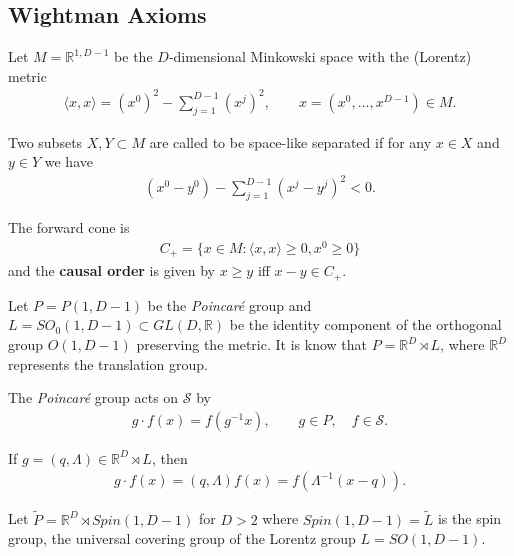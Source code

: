 \documentclass[a4paper,10pt]{amsart}
\newcommand{\SSS}{\mathcal S}
\newcommand{\PPP}{\widetilde{P}}
\newcommand{\LLL}{\widetilde{L}}
\newcommand{\R}{\mathbb R}  %
\begin{document}
\subsection{Wightman Axioms}

Let $M = \R^{1, D-1}$ be the $D$-dimensional Minkowski space with the 
(Lorentz) metric
\begin{align*}
    \langle x, x \rangle = (x^{0})^{2} - \sum_{j=1}^{D-1}(x^{j})^{2},
    \qquad x = (x^{0}, \ldots, x^{D-1}) \in M.
\end{align*}

Two subsets $X, Y \subset M$ are called to be space-like separated if for
any $x \in X$ and $y \in Y$ we have
\begin{align*}
    (x^{0} - y^{0}) - \sum^{D-1}_{j=1}(x^{j} - y^{j})^2 < 0. 
\end{align*}

The forward cone is 
\begin{align*}
    C_{+} = \{x \in M : \langle x, x \rangle \geq 0, x^{0} \geq 0\}
\end{align*}
and the \textbf{causal order} is given by $x \geq y$ iff $x-y \in C_{+}$.

Let $P = P(1, D-1)$ be the \textit{Poincar\'{e}} group and
$L = SO_{0}(1, D-1) \subset GL(D, \R)$ be the identity component of 
the orthogonal group $O(1, D-1)$ preserving the metric.
It is know that $P = \R^{D} \rtimes L$, where $\R^{D}$ represents 
the translation group.

The \textit{Poincar\'{e}} group acts on $\SSS$ by
\begin{align*}
    g \cdot  f(x) = f(g^{-1}x), \qquad g \in P, \quad f \in \SSS.
\end{align*}

If $g = (q, \Lambda) \in \R^{D} \rtimes L$, then
\begin{align*}
    g \cdot f (x) = (q, \Lambda)f(x) = f(\Lambda^{-1}(x-q)). 
\end{align*}

Let $\PPP = \R^{D} \rtimes Spin(1, D-1)$ for $D > 2$ where
$Spin(1,D-1)=\LLL$ is the spin group, 
the universal covering group of the Lorentz group $L = SO(1, D-1)$.
\end{document}
